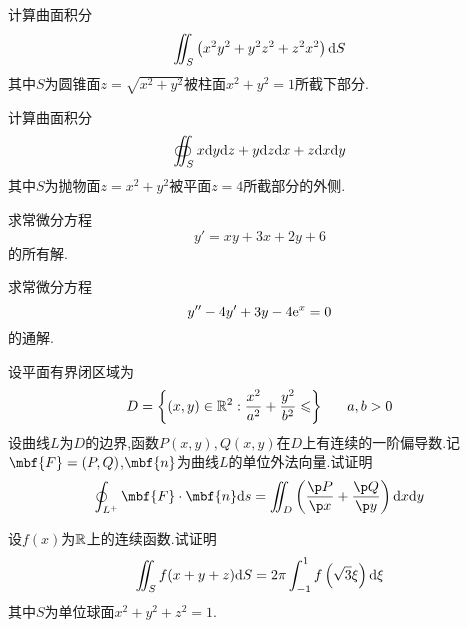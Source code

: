 \documentclass{ctexart}
\begin{document}
\begin{problem}[4.(10\songti{分})]
    计算曲面积分
    \[\iint_{S}\left(x^2y^2+y^2z^2+z^2x^2\right)\mathrm{d} S\]
    其中$S$为圆锥面$z=\sqrt{x^2+y^2}$被柱面$x^2+y^2=1$所截下部分.
\end{problem}
\begin{problem}[5.(15\songti{分})]
    计算曲面积分
    \[\oiint_Sx\mathrm{d} y\mathrm{d} z+y\mathrm{d} z\mathrm{d} x+z\mathrm{d} x\mathrm{d} y\]
    其中$S$为抛物面$z=x^2+y^2$被平面$z=4$所截部分的外侧.
\end{problem}
\begin{problem}[6.(10\songti{分})]
    求常微分方程
    \[y'=xy+3x+2y+6\]
    的所有解.
\end{problem}\begin{problem}[7.(15\songti{分})]
    求常微分方程
    \[y''-4y'+3y-4\mathrm{e}^x=0\]
    的通解.
\end{problem}\begin{problem}[8.(10\songti{分})]
    设平面有界闭区域为
    \[D=\left\{(x,y)\in\R^2:\dfrac{x^2}{a^2}+\dfrac{y^2}{b^2}\leqslant\right\}\ \ \ \ \ a,b>0\]
    设曲线$L$为$D$的边界,函数$P(x,y),Q(x,y)$在$D$上有连续的一阶偏导数.记$\mbf{F}=(P,Q)$,$\mbf{n}$为曲线$L$的单位外法向量.试证明
    \[\oint_{L^+}\mbf{F}\cdot\mbf{n}\di s=\iint_{D}\left(\dfrac{\p P}{\p x}+\dfrac{\p Q}{\p y}\right)\di x\di y\]
\end{problem}\begin{problem}[9.(10\songti{分})]
    设$f(x)$为$\mathbb{R}$上的连续函数.试证明
    \[\iint_{S}f(x+y+z)\mathrm{d} S=2\pi\int_{-1}^{1}f\left(\sqrt{3}\xi\right)\mathrm{d}\xi\]
    其中$S$为单位球面$x^2+y^2+z^2=1$.
\end{problem}
\end{document}
